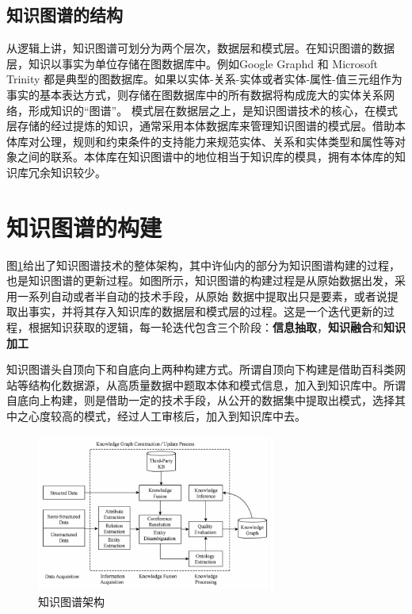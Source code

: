 \documentclass[11pt]{article}
\begin{document}
	\subsection{知识图谱的结构}
	从逻辑上讲，知识图谱可划分为两个层次，数据层和模式层。在知识图谱的数据层，知识以事实为单位存储在图数据库中。例如Google Graphd 和 Microsoft Trinity 都是典型的图数据库。如果以实体-关系-实体或者实体-属性-值三元组作为事实的基本表达方式，则存储在图数据库中的所有数据将构成庞大的实体关系网络，形成知识的“图谱”。
	模式层在数据层之上，是知识图谱技术的核心，在模式层存储的经过提炼的知识，通常采用本体数据库来管理知识图谱的模式层。借助本体库对公理，规则和约束条件的支持能力来规范实体、关系和实体类型和属性等对象之间的联系。本体库在知识图谱中的地位相当于知识库的模具，拥有本体库的知识库冗余知识较少。
		
		
	\section{知识图谱的构建}
	图\ref{figure01}给出了知识图谱技术的整体架构，其中许仙内的部分为知识图谱构建的过程，也是知识图谱的更新过程。如图所示，知识图谱的构建过程是从原始数据出发，采用一系列自动或者半自动的技术手段，从原始
	数据中提取出只是要素，或者说提取出事实，并将其存入知识库的数据层和模式层的过程。这是一个迭代更新的过程，根据知识获取的逻辑，每一轮迭代包含三个阶段：\textbf{信息抽取}，\textbf{知识融合}和\textbf{知识加工}
	
	知识图谱头自顶向下和自底向上两种构建方式。所谓自顶向下构建是借助百科类网站等结构化数据源，从高质量数据中题取本体和模式信息，加入到知识库中。所谓自底向上构建，则是借助一定的技术手段，从公开的数据集中提取出模式，选择其中之心度较高的模式，经过人工审核后，加入到知识库中去。
	
	
	\begin{figure}[htbp]
		\centering
		\includegraphics[width=0.7\textwidth]{pic/build_kg.png}
		\caption{知识图谱架构}
		\label{figure01}
	\end{figure}
\end{document}
